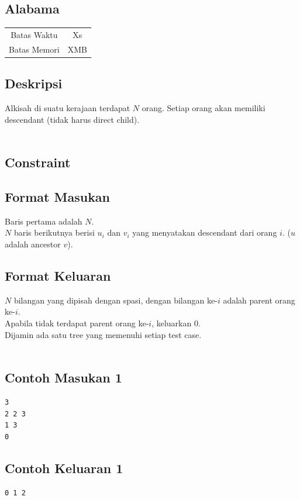 \documentclass{article}
\begin{document}
\begin{center}
    \section*{Alabama} %

    \begin{tabular}{ | c c | }
        \hline
        Batas Waktu  & Xs \\    %
        Batas Memori & XMB \\  %
        \hline
    \end{tabular}
\end{center}

\subsection*{Deskripsi}
Alkisah di suatu kerajaan terdapat $N$ orang. Setiap orang akan memiliki descendant (tidak harus direct child).
\\~\\

\subsection*{Constraint}


\subsection*{Format Masukan}
Baris pertama adalah $N$. \\
$N$ baris berikutnya berisi $u_i$ dan $v_i$ yang menyatakan descendant dari orang $i$. ($u$ adalah ancestor $v$). \\

\subsection*{Format Keluaran}
$N$ bilangan yang dipisah dengan spasi, dengan bilangan ke-$i$ adalah parent orang ke-$i$. \\
Apabila tidak terdapat parent orang ke-$i$, keluarkan 0. \\
Dijamin ada satu tree yang memenuhi setiap test case.
\\~\\

\begin{multicols}{2}
\subsection*{Contoh Masukan 1}
\begin{lstlisting}
3
2 2 3
1 3
0
\end{lstlisting}
\columnbreak
\subsection*{Contoh Keluaran 1}
\begin{lstlisting}
0 1 2
\end{lstlisting}
\vfill
\null
\end{multicols}
\end{document}
